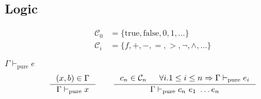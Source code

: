 \documentclass[10pt,a4paper]{article}
\newtheorem{claim}{Claim}
\newcommand\efun[2]{\ensuremath{\lambda #1 . #2}}
\newcommand\eapp[2]{\ensuremath{#1 \ #2}}
\newcommand\etrue{\ensuremath{\text{true}}}
\newcommand\efalse{\ensuremath{\text{false}}}
\newcommand\tref[3]{\ensuremath{\left\lbrace {#1} \colon {#2} \mid {#3} \right\rbrace}}
\newcommand\fin[1]{\ensuremath{\exists v. \evals{#1}{v}}}
\newcommand\sub[2]{\ensuremath{\left[ #2 / #1 \right]}}
\newcommand\interp[1]{\ensuremath{[|#1|]}}
\newcommand\evals[2]{\ensuremath{#1 \hookrightarrow^\star #2}}
\newcommand\ispure[2]{\ensuremath{#1 \vdash_{\text{pure}} #2}}
\newcommand\issubref[3]{\ensuremath{#1 \vdash #2 \Rightarrow #3}}
\begin{document}
\subsection{Logic}
\begin{align*}
\mathcal{C}_0 &= \{ \etrue, \efalse, 0, 1, \dots \} \\
\mathcal{C}_i &= \{ f, +, -, = , >, \lnot, \land, \dots \}
\end{align*}

\hfill\mbox{\ispure{\Gamma}{e}}
$$
\inference{
	(x,b) \in \Gamma
}{
	\ispure{\Gamma}{x}
}
\qquad
\inference{
	c_n \in \mathcal{C}_n &&
	\forall i. 1 \leq i \leq n \Rightarrow \ispure{\Gamma}{e_i}
}{
	\ispure{\Gamma}{c_n\ e_1\ \dots e_n}
}
$$

\end{document}

